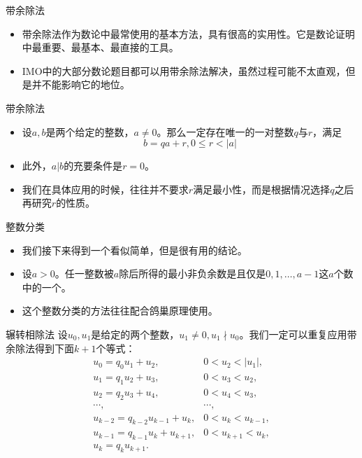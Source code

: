 \documentclass[dvipdfmx]{beamer}
\newcommand{\aabs}[1]{{ \left| #1 \right| }}
\begin{document}
\begin{frame}{带余除法}
\begin{itemize}
\item 带余除法作为数论中最常使用的基本方法，具有很高的实用性。它是数论证明中最重要、最基本、最直接的工具。
\item IMO中的大部分数论题目都可以用带余除法解决，虽然过程可能不太直观，但是并不能影响它的地位。
\end{itemize}
\end{frame}

\begin{frame}{带余除法}
\begin{itemize}
\item 设$a,b$是两个给定的整数，$a\neq 0$。那么一定存在唯一的一对整数$q$与$r$，满足
\begin{displaymath}
b = qa + r, 0\leq r<\aabs{a}
\end{displaymath}
\item 此外，$a|b$的充要条件是$r=0$。
\item 我们在具体应用的时候，往往并不要求$r$满足最小性，而是根据情况选择$q$之后再研究$r$的性质。
\end{itemize}
\end{frame}

\begin{frame}{整数分类}
\begin{itemize}
\item 我们接下来得到一个看似简单，但是很有用的结论。
\item 设$a>0$。任一整数被$a$除后所得的最小非负余数是且仅是$0,1,\dotsc,a-1$这$a$个数中的一个。
\item 这个整数分类的方法往往配合鸽巢原理使用。
\end{itemize}
\end{frame}

\begin{frame}{辗转相除法}
设$u_0,u_1$是给定的两个整数，$u_1\neq 0,u_1\nmid u_0$。我们一定可以重复应用带余除法得到下面$k+1$个等式：
\begin{equation*}
\begin{array}{ll}
u_0 = q_0  u_1 +u_2 ,    &  0 < u_2 < \aabs{u_1} ,\\
u_1 = q_1  u_2 +u_3 ,    &  0 < u_3 < u_2 ,       \\
u_2 = q_2  u_3 +u_4 ,    &  0 < u_4 < u_3 ,       \\
\cdots,                   &  \cdots        ,      \\
u_{k-2} = q_{k-2} u_{k-1} +u_k ,    &  0 < u_k < u_{k-1} ,   \\
u_{k-1} = q_{k-1}  u_k +u_{k+1} ,    &  0 < u_{k+1} < u_k ,   \\
u_k = q_k  u_{k+1} .    & 
\end{array}
\end{equation*}
\end{frame}
\end{document}
